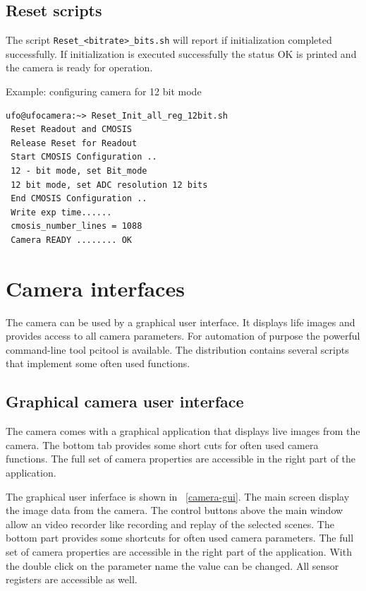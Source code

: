 \newpage
\subsection{Reset scripts}
The script \verb/Reset_<bitrate>_bits.sh/ will report if initialization completed successfully. 
If initialization is executed successfully the status  OK  is printed and the camera is ready for operation.

Example: configuring camera for 12 bit mode  

\begin{lstlisting}
ufo@ufocamera:~> Reset_Init_all_reg_12bit.sh
 Reset Readout and CMOSIS 
 Release Reset for Readout
 Start CMOSIS Configuration ..
 12 - bit mode, set Bit_mode 
 12 bit mode, set ADC resolution 12 bits 
 End CMOSIS Configuration ..
 Write exp time......
 cmosis_number_lines = 1088
 Camera READY ........ OK
\end{lstlisting}


\newpage
\section{Camera interfaces}

The camera can be used by a graphical user interface. It displays life images and provides access to all camera parameters. 
For automation of purpose the powerful command-line tool pcitool is available. The distribution contains several scripts that 
implement some often used functions.

\subsection{Graphical camera user interface}

The camera comes with a graphical application that displays live images from the camera. 
The bottom tab provides some short cuts for often used camera functions. 
The full set of camera properties are accessible in the right part of the application. 

The graphical user inferface is shown in \figurename~\ref{camera-gui}.  The main screen display the image data from the camera. The control buttons above the main window allow an video recorder like recording and replay of the selected scenes.
The bottom part provides some shortcuts for often used camera parameters.  The full set of camera properties are accessible in the right part of the application. With the double click on the parameter name the value can be changed. All sensor registers are accessible as well. 


